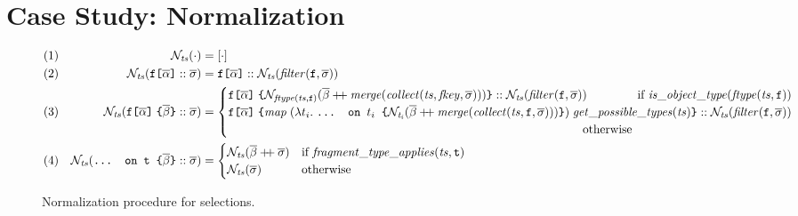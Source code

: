 \section{Case Study: Normalization}\label{sec:norm}

\begin{figure*}[t]
  \small
  \begin{flushright}
  \end{flushright}  
  \centering
  \vspace{-1ex}
    \begin{align*}
    & (1) & \tnorm{\cdot} &= [\cdot] \\
    & (2) & \tnorm{\fld :: \sset} &= 
       	\fld :: \tnorm{\filter{\sset}{\fkey}} \\      
    & (3) & \tnorm{\nfld{\overline{\beta}} :: \sset} &=
    \begin{cases}
        \nfld{\norm{\mathit{\ftype{ts}{\fkey}}}{\overline{\beta} \mdoubleplus \mathit{merge (\collect{ts}{fkey}{\sset})}}} :: \tnorm{\filter{\sset}{\fkey}} \hfill \text{ if } 
	            \mathit{is\_object\_type (\ftype{ts}{\fkey})}\\
    \nfld{\mathit{map}\; (\lambda t_{i}.\; \ifrag{$t_{i}$}{\norm{t_{i}}{\overline{\beta} \mdoubleplus \mathit{merge (\collect{ts}{\fkey}{\sset})}}})\; \mathit{get\_possible\_types (ts)}} 
    		:: \tnorm{\filter{\sset}{\fkey}} \\
		\quad\quad\quad\quad\quad\quad\quad\quad\quad\quad\quad\quad\quad\quad\quad\quad\quad\quad\quad\quad\quad\quad\quad\quad\quad\quad\quad\quad\quad\; \text{ otherwise } 
    \end{cases}\\
    & (4) & \tnorm{\ifrag{t}{\overline{\beta}} :: \sset} &= 
    \begin{cases}
    \tnorm{\overline{\beta} \mdoubleplus \sset} & 
    \text{if }\mathit{fragment\_type\_applies(ts, \texttt{t})}\\
    \tnorm{\sset} & \text{otherwise}
    \end{cases}
    \end{align*}
    \caption{Normalization procedure for \gql selections. 
    }
\label{fig:normalize}
\end{figure*}

